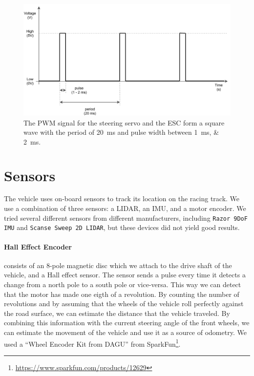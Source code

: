 \begin{figure}\centering
	\includegraphics[width=125mm]{../img/pwm.pdf}
	\caption{The PWM signal for the steering servo and the ESC form a square wave with the period of \SI{20}{\milli\second} and pulse width between \SIlist{1;2}{\milli\second}.}
	\label{fig:pwm}
\end{figure}

\section{Sensors}

The vehicle uses on-board sensors to track its location on the racing track. We use a combination of three sensors: a \gls{LIDAR}, an \gls{IMU}, and a motor encoder. We tried several different sensors from different manufacturers, including \verb|Razor 9DoF IMU| and \verb|Scanse Sweep 2D LIDAR|, but these devices did not yield good results. 

\paragraph{Hall Effect Encoder} consists of an 8-pole magnetic disc which we attach to the drive shaft of the vehicle, and a Hall effect sensor. The sensor sends a pulse every time it detects a change from a north pole to a south pole or vice-versa. This way we can detect that the motor has made one eigth of a revolution. By counting the number of revolutions and by assuming that the wheels of the vehicle roll perfectly against the road surface, we can estimate the distance that the vehicle traveled. By combining this information with the current steering angle of the front wheels, we can estimate the movement of the vehicle and use it as a source of odometry. We used a ``Wheel Encoder Kit from DAGU'' from SparkFun\footnote{\url{https://www.sparkfun.com/products/12629}}.

